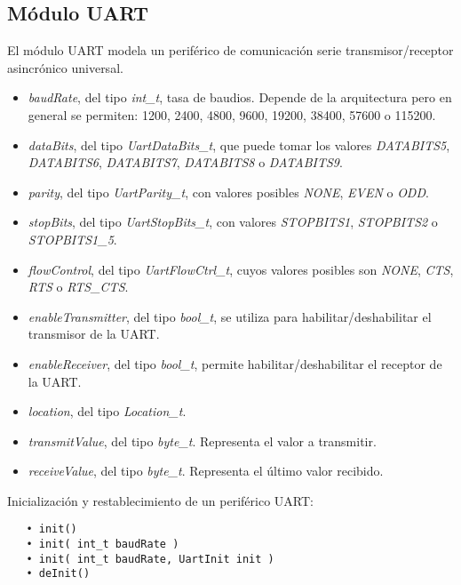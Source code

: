 \subsection{Módulo UART}

El módulo UART modela un periférico de comunicación serie transmisor/receptor asincrónico universal.


\begin{itemize}
\item
\emph{baudRate}, del tipo \emph{int\_t}, tasa de baudios. Depende de la arquitectura pero en general se permiten: 1200, 2400, 4800, 9600, 19200, 38400, 57600 o 115200.
\item
\emph{dataBits}, del tipo \emph{UartDataBits\_t}, que puede tomar los valores \emph{DATABITS5}, \emph{DATABITS6}, \emph{DATABITS7}, \emph{DATABITS8} o \emph{DATABITS9}.
\item
\emph{parity}, del tipo \emph{UartParity\_t}, con valores posibles \emph{NONE}, \emph{EVEN} o \emph{ODD}.
\item
\emph{stopBits}, del tipo \emph{UartStopBits\_t}, con valores \emph{STOPBITS1}, \emph{STOPBITS2} o \emph{STOPBITS1\_5}.
\item
\emph{flowControl}, del tipo \emph{UartFlowCtrl\_t}, cuyos valores posibles son \emph{NONE}, \emph{CTS}, \emph{RTS} o \emph{RTS\_CTS}.
\item
\emph{enableTransmitter}, del tipo \emph{bool\_t}, se utiliza para habilitar/deshabilitar el transmisor de la UART.
\item
\emph{enableReceiver}, del tipo \emph{bool\_t}, permite habilitar/deshabilitar el receptor de la UART.
\item
\emph{location}, del tipo \emph{Location\_t}.
\item
\emph{transmitValue}, del tipo \emph{byte\_t}. Representa el valor a transmitir.
\item
\emph{receiveValue}, del tipo \emph{byte\_t}. Representa el último valor recibido. 
\end{itemize}


Inicialización y restablecimiento de un periférico UART:

\begin{verbatim}
   • init()
   • init( int_t baudRate )
   • init( int_t baudRate, UartInit init )
   • deInit()
\end{verbatim}

